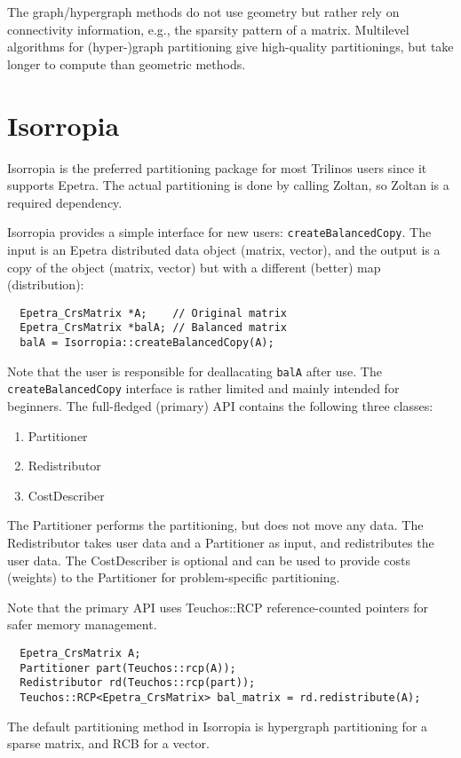 The graph/hypergraph methods do not use geometry but rather rely on connectivity information, e.g., the sparsity pattern of a matrix. Multilevel algorithms for (hyper-)graph partitioning give high-quality partitionings, but take longer to compute than geometric methods.

\section{Isorropia}
\label{sec:isorropia}
Isorropia is the preferred partitioning package for most Trilinos users
since it supports Epetra. The actual partitioning is done by calling Zoltan,
so Zoltan is a required dependency.

Isorropia provides a simple interface for new users: \texttt{createBalancedCopy}. The input is an Epetra distributed data object (matrix, vector), and the output is a copy of the object (matrix, vector) but with a different (better) map (distribution):
\begin{verbatim}
  Epetra_CrsMatrix *A;    // Original matrix
  Epetra_CrsMatrix *balA; // Balanced matrix
  balA = Isorropia::createBalancedCopy(A);
\end{verbatim}
Note that the user is responsible for deallacating \texttt{balA} after use.
The \texttt{createBalancedCopy} interface is rather limited and mainly intended for beginners. The full-fledged (primary) API contains the following three classes:
\begin{enumerate}
\item Partitioner
\item Redistributor
\item CostDescriber
\end{enumerate}
The Partitioner performs the partitioning, but does not move any data. The Redistributor takes user data and a Partitioner as input, and redistributes the user data. The CostDescriber is optional and can be used to provide costs (weights) to the Partitioner for problem-specific partitioning. 

Note that the primary API uses Teuchos::RCP reference-counted pointers for safer memory management.

\begin{verbatim}
  Epetra_CrsMatrix A;
  Partitioner part(Teuchos::rcp(A));
  Redistributor rd(Teuchos::rcp(part));
  Teuchos::RCP<Epetra_CrsMatrix> bal_matrix = rd.redistribute(A);
\end{verbatim}

The default partitioning method in Isorropia is hypergraph partitioning for a sparse matrix, and RCB for a vector.

